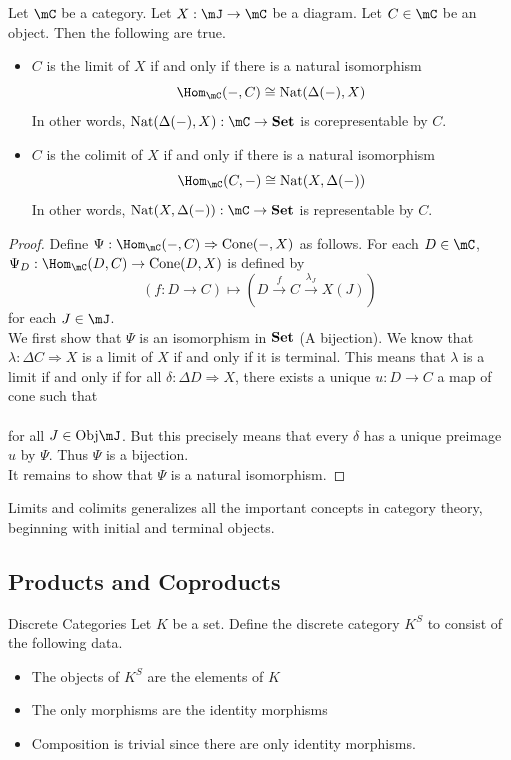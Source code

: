 \documentclass[a4paper]{article}
\begin{document}
\begin{thm}{}{} Let $\mC$ be a category. Let $X:\mJ\to\mC$ be a diagram. Let $C\in\mC$ be an object. Then the following are true. 
\begin{itemize}
\item $C$ is the limit of $X$ if and only if there is a natural isomorphism $$\Hom_\mC(-,C)\cong\text{Nat}(\Delta(-),X)$$ In other words, $\text{Nat}(\Delta(-),X):\mC\to\bold{Set}$ is corepresentable by $C$. 
\item $C$ is the colimit of $X$ if and only if there is a natural isomorphism $$\Hom_\mC(C,-)\cong\text{Nat}(X,\Delta(-))$$ In other words, $\text{Nat}(X,\Delta(-)):\mC\to\bold{Set}$ is representable by $C$. 
\end{itemize} 
\begin{proof}
Define $\Psi:\Hom_\mC(-,C)\Rightarrow\text{Cone}(-,X)$ as follows. For each $D\in\mC$, $\Psi_D:\Hom_\mC(D,C)\to\text{Cone}(D,X)$ is defined by $$(f:D\to C)\mapsto\left(D\overset{f}{\rightarrow}C\overset{\lambda_J}{\rightarrow}X(J)\right)$$ for each $J\in\mJ$. \\

We first show that $\Psi$ is an isomorphism in $\bold{Set}$ (A bijection). We know that $\lambda:\Delta C\Rightarrow X$ is a limit of $X$ if and only if it is terminal. This means that $\lambda$ is a limit if and only if for all $\delta:\Delta D\Rightarrow X$, there exists a unique $u:D\to C$ a map of cone such that \\
\\
for all $J\in\text{Obj}\mJ$. But this precisely means that every $\delta$ has a unique preimage $u$ by $\Psi$. Thus $\Psi$ is a bijection. \\

It remains to show that $\Psi$ is a natural isomorphism. 
\end{proof}
\end{thm}

Limits and colimits generalizes all the important concepts in category theory, beginning with initial and terminal objects. 

\subsection{Products and Coproducts}
\begin{defn}{Discrete Categories}{} Let $K$ be a set. Define the discrete category $K^S$ to consist of the following data. 
\begin{itemize}
\item The objects of $K^S$ are the elements of $K$
\item The only morphisms are the identity morphisms
\item Composition is trivial since there are only identity morphisms. 
\end{itemize}
\end{defn}
\end{document}
